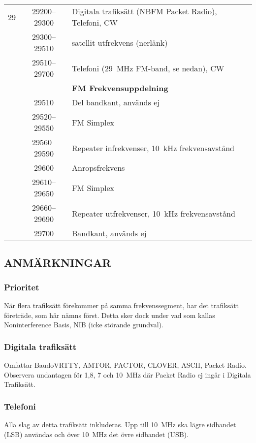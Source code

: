 \begin{longtable}{lcl}
29   & 29200--29300 & Digitala trafiksätt (NBFM Packet Radio), Telefoni, CW \\
     & 29300--29510 & satellit utfrekvens (nerlänk) \\
     & 29510--29700 & Telefoni (29~MHz FM-band, se nedan), CW \\
     &              & \textbf{FM Frekvensuppdelning} \\
     & 29510        & Del bandkant, används ej \\
     & 29520--29550 & FM Simplex \\
     & 29560--29590 & Repeater infrekvenser, 10~kHz frekvensavstånd \\
     & 29600        & Anropsfrekvens \\
     & 29610--29650 & FM Simplex \\
     & 29660--29690 & Repeater utfrekvenser, 10~kHz frekvensavstånd \\
     & 29700        & Bandkant, används ej \\
\end{longtable}

\subsection{ANMÄRKNINGAR}

\subsubsection{Prioritet}

När flera trafiksätt förekommer på samma frekvenssegment, har det
trafiksätt företräde, som här nämns först. Detta sker dock under
vad som kallas Noninterference Basis, NIB (icke störande grundval).

\subsubsection{Digitala trafiksätt}

Omfattar BaudoVRTTY, AMTOR, PACTOR, CLOVER, ASCII, Packet Radio.
Observera undantagen för 1,8, 7 och 10~MHz där Packet Radio ej
ingår i Digitala Trafiksätt.

\subsubsection{Telefoni}

Alla slag av detta trafiksätt inkluderas.
Upp till 10~MHz ska lägre sidbandet (LSB) användas och över 10~MHz det övre
sidbandet (USB).

